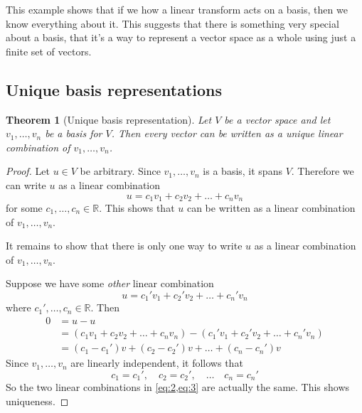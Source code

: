 \documentclass[10pt]{article}
\newtheorem{theorem}{Theorem}
\theoremstyle{definition}
\newcommand{\R}{\mathbb{R}}           %
\begin{document}
This example shows that if we how a linear transform acts on a basis, then we
know everything about it. This suggests that there is something very special
about a basis, that it's a way to represent a vector space as a whole using
just a finite set of vectors.

\subsection{Unique basis representations}


\begin{theorem}[Unique basis representation]
  \label{thm:unique-basis-representation}
  Let $V$ be a vector space and let $v_{1},\ldots,v_{n}$ be a basis for $V$.
  Then every vector can be written as a unique linear combination
  of $v_{1},\ldots,v_{n}$.
\end{theorem}
\begin{proof}
  Let $u\in V$ be arbitrary. Since $v_{1},\ldots,v_{n}$ is a basis, it spans
  $V$. Therefore we can write $u$ as a linear combination
  \begin{equation}\label{eq:2}
    u = c_{1}v_{1}+c_{2}v_{2}+\ldots+c_{n}v_{n}
  \end{equation}
  for some $c_{1},\ldots,c_{n}\in \R$. This shows that $u$ can be written as a
  linear combination of $v_{1},\ldots,v_{n}$.

  It remains to show that there is only one way to write $u$ as a linear
  combination of $v_{1},\ldots,v_{n}$.

  Suppose we have some \textit{other} linear combination
  \begin{equation}\label{eq:3}
    u = c_{1}'v_{1}+c_{2}'v_{2}+\ldots+c_{n}'v_{n}
  \end{equation}
  where $c_{1}',\ldots,c_{n}\in \R$. Then
  \begin{align*}
    0 
    &= u-u\\
    &= \left(  c_{1}v_{1}+c_{2}v_{2}+\ldots+c_{n}v_{n} \right) - \left(  c_{1}'v_{1}+c_{2}'v_{2}+\ldots+c_{n}'v_{n} \right)\\ 
    &= (c_{1}-c_{1}')v+(c_{2}-c_{2}')v+\ldots+ (c_{n}-c_{n}')v
  \end{align*}
  Since $v_{1},\ldots,v_{n}$ are linearly independent, it follows that
  \begin{equation*}
    c_{1}=c_{1}', \quad c_{2}=c_{2}',\quad \ldots \quad c_{n}=c_{n}'
  \end{equation*}
  So the two linear combinations in \cref{eq:2,eq:3} are actually the same.
  This shows uniqueness.
\end{proof}
\end{document}
